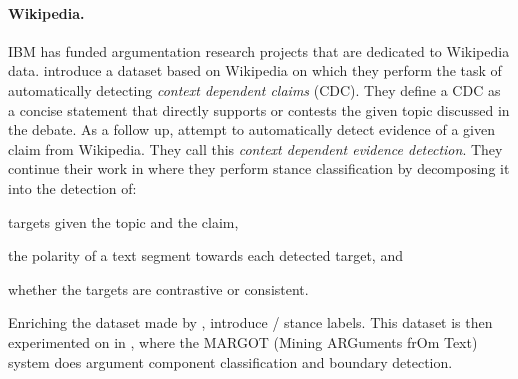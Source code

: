 \paragraph{Wikipedia.} IBM has funded argumentation research projects that are
dedicated to Wikipedia data. \citet{levy2014context} introduce a dataset based
on Wikipedia on which they perform the task of automatically detecting
\emph{context dependent claims} (CDC).  They define a CDC as a concise statement
that directly supports or contests the given topic discussed in the debate. As
a follow up, \citet{rinott2015show} attempt to automatically detect evidence of
a given claim from Wikipedia.  They call this \emph{context dependent evidence
detection}.  They continue their work in \citep{bar2017stance} where they
perform stance classification by decomposing it into the detection of: 
\begin{enumerate*}[label=(\arabic*)]
	\item targets given the topic and the claim,
	\item the polarity of a text segment towards each detected target, and
	\item whether the targets are contrastive or consistent. 
\end{enumerate*}
Enriching the dataset made by \citet{levy2014context}, \citet{bar2017stance}
introduce  /  stance labels. This dataset is then experimented on in
\citep{lippi2016margot}, where the MARGOT (Mining ARGuments frOm Text) system
does argument component classification and boundary detection. 

